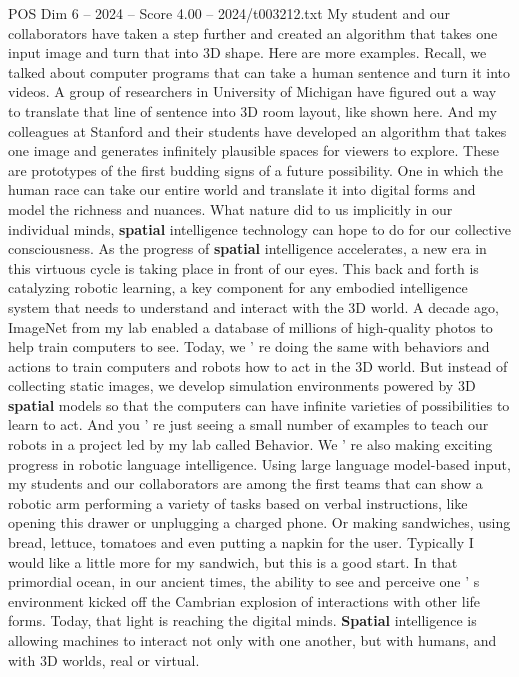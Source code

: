 \begin{textsample}{POS Dim 6 – 2024 – Score 4.00 – 2024/t003212.txt}
My student and our collaborators have taken a step further and created an algorithm that takes one input image and turn that into 3D shape.
Here are more examples.
Recall, we talked about computer programs that can take a human sentence and turn it into videos.
A group of researchers in University of Michigan have figured out a way to translate that line of sentence into 3D room layout, like shown here.
And my colleagues at Stanford and their students have developed an algorithm that takes one image and generates infinitely plausible spaces for viewers to explore.
These are prototypes of the first budding signs of a future possibility.
One in which the human race can take our entire world and translate it into digital forms and model the richness and nuances.
What nature did to us implicitly in our individual minds, \textbf{spatial} intelligence technology can hope to do for our collective consciousness.
As the progress of \textbf{spatial} intelligence accelerates, a new era in this virtuous cycle is taking place in front of our eyes.
This back and forth is catalyzing robotic learning, a key component for any embodied intelligence system that needs to understand and interact with the 3D world.
A decade ago, ImageNet from my lab enabled a database of millions of high-quality photos to help train computers to see.
Today, we ' re doing the same with behaviors and actions to train computers and robots how to act in the 3D world.
But instead of collecting static images, we develop simulation environments powered by 3D \textbf{spatial} models so that the computers can have infinite varieties of possibilities to learn to act.
And you ' re just seeing a small number of examples to teach our robots in a project led by my lab called Behavior.
We ' re also making exciting progress in robotic language intelligence.
Using large language model-based input, my students and our collaborators are among the first teams that can show a robotic arm performing a variety of tasks based on verbal instructions, like opening this drawer or unplugging a charged phone.
Or making sandwiches, using bread, lettuce, tomatoes and even putting a napkin for the user.
Typically I would like a little more for my sandwich, but this is a good start.
In that primordial ocean, in our ancient times, the ability to see and perceive one ' s environment kicked off the Cambrian explosion of interactions with other life forms.
Today, that light is reaching the digital minds. \textbf{Spatial} intelligence is allowing machines to interact not only with one another, but with humans, and with 3D worlds, real or virtual.

\end{textsample}
